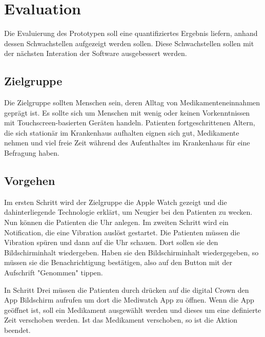 
\section{Evaluation}

Die Evaluierung des Prototypen soll eine quantifiziertes Ergebnis liefern, anhand dessen Schwachstellen aufgezeigt werden sollen. Diese Schwachstellen sollen mit der nächsten Interation der Software ausgebessert werden.

\subsection{Zielgruppe}
Die Zielgruppe sollten Menschen sein, deren Alltag von Medikamenteneinnahmen geprägt ist. Es sollte sich um Menschen mit wenig oder keinen Vorkenntnissen mit Touchscreen-basierten Geräten handeln.  Patienten fortgeschrittenen Altern, die sich stationär im Krankenhaus aufhalten eignen sich gut, Medikamente nehmen und viel freie Zeit während des Aufenthaltes im Krankenhaus für eine Befragung haben.

\subsection{Vorgehen}
Im ersten Schritt wird der Zielgruppe die Apple Watch gezeigt und die dahinterliegende Technologie erklärt, um Neugier bei den Patienten zu wecken. Nun können die Patienten die Uhr anlegen. 
Im zweiten Schritt wird ein Notification, die eine Vibration auslöst gestartet. Die Patienten müssen die Vibration spüren und dann auf die Uhr schauen. Dort sollen sie den Bildschirminhalt wiedergeben. Haben sie den Bildschirminhalt wiedergegeben, so müssen sie die Benachrichtigung bestätigen, also auf den Button mit der Aufschrift "Genommen" tippen.

In Schritt Drei müssen die Patienten durch drücken auf die digital Crown den App Bildschirm aufrufen um dort die Mediwatch App zu öffnen. Wenn die App geöffnet ist, soll ein Medikament ausgewählt werden und dieses um eine definierte Zeit verschoben werden. Ist das Medikament verschoben, so ist die Aktion beendet.


